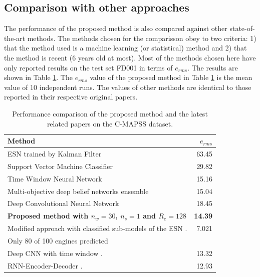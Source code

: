 \documentclass[preprint,12pt]{elsarticle}%
\begin{document}
\subsection{Comparison with other approaches}

The performance of the proposed method is also compared against
other state-of-the-art methods. The methods chosen for the comparisson obey to two criteria: 1) that the method used is a machine learning (or statistical) method and 2) that the method is recent (6 years old at most). Most of the methods chosen here 
have only reported results on the test set FD001 in terms of
$e_{rms}$. The results are shown in Table \ref{table:results_comparison}. The
$e_{rms}$ value of the proposed method in Table \ref{table:results_comparison}
is the mean value of 10 independent runs. The values of other methods are
identical to those reported in their respective original papers.

\begin{table}[!htb]
\begin{center}
\begin{tabular}[c]{l|r}\hline
Method & $e_{rms}$\\\hline
ESN trained by Kalman Filter \cite{Peng2012} & 63.45\\
Support Vector Machine Classifier \cite{Louen2013} & 29.82\\
Time Window Neural Network \cite{Lim2016} & 15.16\\
Multi-objective deep belief networks ensemble \cite{Zhang2016} & 15.04\\
Deep Convolutional Neural Network \cite{Babu2016} & 18.45\\
\textbf{Proposed method with $n_{w}=30$, $n_{s}=1$ and $R_{e}=128$} & \textbf{14.39}\\
Modified approach with classified sub-models of the ESN \cite{Peng2012}. & 7.021\\
Only 80 of 100 engines predicted & \\
Deep CNN with time window \cite{Li2018}. & 13.32\\
RNN-Encoder-Decoder \cite{Malhorta2016}. & 12.93\\
\hline
\end{tabular}
\caption{Performance comparison of the proposed method and the latest related papers on the C-MAPSS dataset.}
\label{table:results_comparison}
\end{center}
\end{table}
\end{document}
